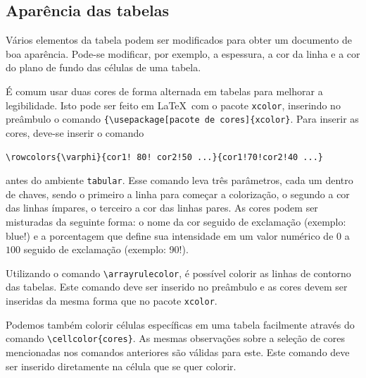 \subsection{Aparência das tabelas}
V\'arios elementos da tabela podem ser modificados para obter um documento de boa apar\^encia. Pode-se modificar, por exemplo, a espessura, a cor da linha e a cor do plano de fundo das c\'elulas de uma tabela. 

\noindent \'E comum usar duas cores de forma alternada em tabelas para melhorar a legibilidade. Isto pode ser feito em \LaTeX\ com o pacote \texttt{xcolor}, inserindo no pre\^ambulo o comando \verb|{\usepackage[pacote de cores]{xcolor}|. Para inserir as cores, deve-se inserir o comando

\begin{center}
\verb|\rowcolors{\varphi}{cor1! 80! cor2!50 ...}{cor1!70!cor2!40 ...}| 
\end{center}

\noindent antes do ambiente \texttt{tabular}. Esse comando leva tr\^es par\^ametros, cada um dentro de chaves, sendo o primeiro a linha para come\c car a coloriza\c c\~ao, o segundo a cor das linhas \'impares, o terceiro a cor das linhas pares. As cores podem ser misturadas da seguinte forma: o nome da cor seguido de exclama\c c\~ao (exemplo: blue!) e a porcentagem que define sua intensidade em um valor numérico de $0$ a $100$ seguido de exclama\c c\~ao (exemplo: 90!).



\noindent Utilizando o comando \verb|\arrayrulecolor|, \'e poss\'ivel colorir as linhas de contorno das tabelas. Este comando deve ser inserido no pre\^ambulo e as cores devem ser inseridas da mesma forma que no pacote \verb|xcolor|.

\noindent Podemos tamb\'em colorir c\'elulas espec\'ificas em uma tabela facilmente atrav\'es do comando \verb|\cellcolor{cores}|. As mesmas observações sobre a sele\c c\~ao de cores mencionadas nos comandos anteriores são v\'alidas para este. Este comando deve ser inserido diretamente na c\'elula que se quer colorir.

